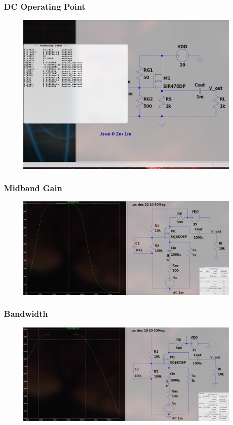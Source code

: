 \documentclass{article}
\begin{document}
\subsubsection{DC Operating Point}
\begin{figure}[h!]
        \centering
        \includegraphics[width=0.7\linewidth]{figs/mosfet_cd_op.png}
    \end{figure}
\pagebreak
\subsubsection{Midband Gain}
\begin{figure}[h!]
        \centering
        \includegraphics[width=0.7\linewidth]{figs/mosfet_cg_mb.png}
    \end{figure}
\subsubsection{Bandwidth}
\begin{figure}[h!]
        \centering
        \includegraphics[width=0.7\linewidth]{figs/mosfet_cg_bw.png}
    \end{figure}
\end{document}
